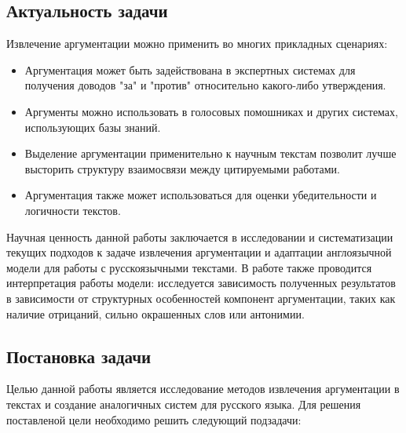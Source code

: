 

\subsection{Актуальность задачи}
Извлечение аргументации можно применить во многих прикладных сценариях:
\begin{itemize}
    \item Аргументация может быть задействована в экспертных системах для получения доводов "за"  и "против" относительно какого-либо утверждения.
    \item Аргументы можно использовать в голосовых помошниках и других системах, использующих базы знаний.
    \item Выделение аргументации применительно к научным текстам позволит лучше высторить структуру взаимосвязи между цитируемыми работами.
    \item Аргументация также может использоваться для оценки убедительности и логичности текстов.
\end{itemize}

Научная ценность данной работы заключается в исследовании и систематизации текущих подходов к задаче извлечения аргументации и адаптации англоязычной модели для работы с русскоязычными текстами. В работе также проводится интерпретация работы модели: исследуется зависимость полученных результатов в зависимости от структурных особенностей компонент аргументации, таких как наличие отрицаний, сильно окрашенных слов или антонимии.

\subsection{Постановка задачи}
Целью данной работы является исследование методов извлечения аргументации в текстах и создание аналогичных систем для русского языка. Для решения поставленой цели необходимо решить следующий подзадачи:


